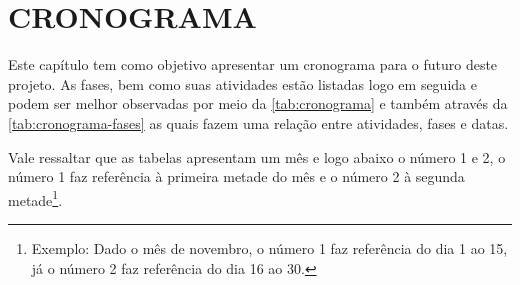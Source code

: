 
\chapter{CRONOGRAMA}
\label{chap:cronograma}

\par Este capítulo tem como objetivo apresentar um cronograma para o futuro deste projeto. As fases, bem como suas atividades estão listadas logo em seguida e podem ser melhor observadas por meio da \autoref{tab:cronograma} e também através da \autoref{tab:cronograma-fases} as quais fazem uma relação entre atividades, fases e datas.

Vale ressaltar que as tabelas apresentam um mês e logo abaixo o número 1 e 2, o número 1 faz referência à primeira metade do mês e o número 2 à segunda metade\footnote{Exemplo: Dado o mês de novembro, o número 1 faz referência do dia 1 ao 15, já o número 2 faz referência do dia 16 ao 30.}.


